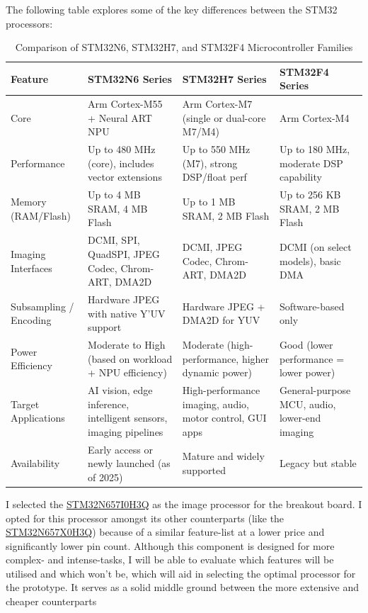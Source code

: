 The following table explores some of the key differences between the STM32 processors:
\begin{table}[H]
\centering
\begin{tabular}{|p{2cm}|p{3.75cm}|p{3.75cm}|p{3.75cm}|}
\hline
\textbf{Feature} & \textbf{STM32N6 Series} & \textbf{STM32H7 Series} & \textbf{STM32F4 Series} \\
\hline
Core & Arm Cortex-M55 + Neural ART NPU & Arm Cortex-M7 (single or dual-core M7/M4) & Arm Cortex-M4 \\
\hline
Performance & Up to 480 MHz (core), includes vector extensions & Up to 550 MHz (M7), strong DSP/float perf & Up to 180 MHz, moderate DSP capability \\
\hline
Memory (RAM/Flash) & Up to 4 MB SRAM, 4 MB Flash & Up to 1 MB SRAM, 2 MB Flash & Up to 256 KB SRAM, 2 MB Flash \\
\hline
Imaging Interfaces & DCMI, SPI, QuadSPI, JPEG Codec, Chrom-ART, DMA2D & DCMI, JPEG Codec, Chrom-ART, DMA2D & DCMI (on select models), basic DMA \\
\hline
Subsampling / Encoding & Hardware JPEG with native Y'UV support & Hardware JPEG + DMA2D for YUV & Software-based only \\
\hline
Power Efficiency & Moderate to High (based on workload + NPU efficiency) & Moderate (high-performance, higher dynamic power) & Good (lower performance = lower power) \\
\hline
Target Applications & AI vision, edge inference, intelligent sensors, imaging pipelines & High-performance imaging, audio, motor control, GUI apps & General-purpose MCU, audio, lower-end imaging \\
\hline
Availability & Early access or newly launched (as of 2025) & Mature and widely supported & Legacy but stable \\
\hline
\end{tabular}
\caption{Comparison of STM32N6, STM32H7, and STM32F4 Microcontroller Families}
\label{tab:stm32-family-comparison}
\end{table}
I selected the \href{https://au.mouser.com/ProductDetail/STMicroelectronics/STM32N657I0H3Q?qs=a2MtRaTmNOQAexZMsq8u8A%3D%3D}{STM32N657I0H3Q} as the image processor for the breakout board. I opted for this processor amongst its other counterparts (like the \href{https://au.mouser.com/ProductDetail/STMicroelectronics/STM32N657X0H3Q?qs=%252BXxaIXUDbq0JgAtfYs%252BpjA%3D%3D}{STM32N657X0H3Q}) because of a similar feature-list at a lower price and significantly lower pin count.
Although this component is designed for more complex- and intense-tasks, I will be able to evaluate which features will be utilised and which won't be, which will aid in selecting the optimal processor for the prototype. It serves as a solid middle ground between the more extensive and cheaper counterparts
